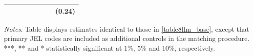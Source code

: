 \begin{table}[H]
\begin{threeparttable}
\begin{tabular}{p{3cm}S[table-format=3.3]@{}S[table-format=3.3]@{}S[table-format=3.2]@{}S[table-format=4.3]@{}S[table-format=3.3]@{}S[table-format=3.1]@{}S@{}}
                                          &            &            &            &            &            &            &      (0.24)   \\
            \bottomrule
        \end{tabular}
        \begin{tablenotes}
            \tiny
            \item \textit{Notes}. Table displays estimates identical to those in \autoref{table8llm_base}, except that primary JEL codes are included as additional controls in the matching procedure. ***, ** and * statistically significant at 1\%, 5\% and 10\%, respectively.
        \end{tablenotes}
    \end{threeparttable}
\end{table}